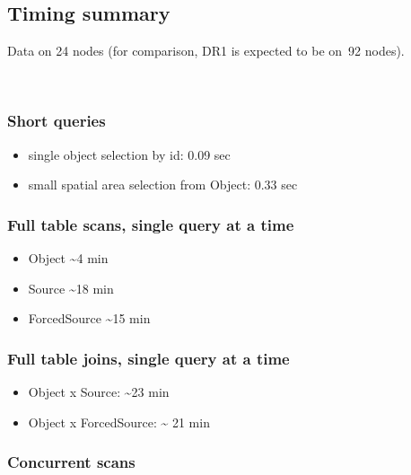 \subsection{Timing summary}\label{timing-summary}

Data on 24 nodes (for comparison, DR1 is expected to be on~92 nodes).

~

\subsubsection{\texorpdfstring{\textbf{Short
queries}}{Short queries}}\label{short-queries}

\begin{itemize}
\item
  single object selection by id: 0.09 sec
\item
  small spatial area selection from Object: 0.33 sec
\end{itemize}

\subsubsection{\texorpdfstring{\textbf{Full table scans, single query at
a
time}}{Full table scans, single query at a time}}\label{full-table-scans-single-query-at-a-time}

\begin{itemize}
\item
  Object \textasciitilde{}4 min
\item
  Source \textasciitilde{}18 min
\item
  ForcedSource \textasciitilde{}15 min
\end{itemize}

\subsubsection{\texorpdfstring{\textbf{Full table joins, single query at
a
time}}{Full table joins, single query at a time}}\label{full-table-joins-single-query-at-a-time}

\begin{itemize}
\item
  Object x Source: \textasciitilde{}23 min
\item
  Object x ForcedSource: \textasciitilde{} 21 min
\end{itemize}

\subsubsection{\texorpdfstring{\textbf{Concurrent
scans}}{Concurrent scans}}\label{concurrent-scans}

